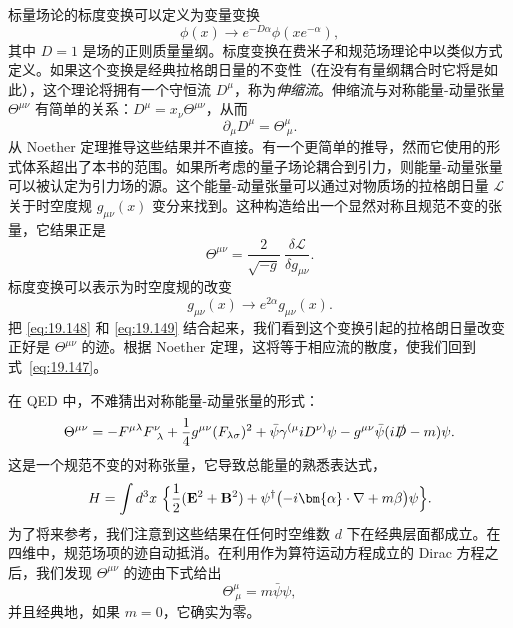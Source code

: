 标量场论的标度变换可以定义为变量变换
\begin{equation}
  \phi(x) \to e^{-D\alpha}\phi(x e^{-\alpha}) ,
  \label{eq:19.146}
\end{equation}
其中 $D = 1$ 是场的正则质量量纲。标度变换在费米子和规范场理论中以类似方式定义。如果这个变换是经典拉格朗日量的不变性（在没有有量纲耦合时它将是如此），这个理论将拥有一个守恒流 $D^\mu$，称为\emph{伸缩流}。伸缩流与对称能量-动量张量 $\Theta^{\mu\nu}$ 有简单的关系：$D^\mu = x_\nu\Theta^{\mu\nu}$，从而
\begin{equation}
  \partial_\mu D^\mu = \Theta^\mu_{\ \mu} .
  \label{eq:19.147}
\end{equation}
从 Noether 定理推导这些结果并不直接。有一个更简单的推导，然而它使用的形式体系超出了本书的范围。如果所考虑的量子场论耦合到引力，则能量-动量张量可以被认定为引力场的源。这个能量-动量张量可以通过对物质场的拉格朗日量 $\mathcal{L}$ 关于时空度规 $g_{\mu\nu}(x)$ 变分来找到。这种构造给出一个显然对称且规范不变的张量，它结果正是
\begin{equation}
  \Theta^{\mu\nu} = \frac{2}{\sqrt{-g}}\ \frac{\delta\mathcal{L}}
    {\delta g_{\mu\nu}} .
  \label{eq:19.148}
\end{equation}
标度变换可以表示为时空度规的改变
\begin{equation}
  g_{\mu\nu}(x) \to e^{2\alpha}g_{\mu\nu}(x) .
  \label{eq:19.149}
\end{equation}
把 \eqref{eq:19.148} 和 \eqref{eq:19.149} 结合起来，我们看到这个变换引起的拉格朗日量改变正好是 $\Theta^{\mu\nu}$ 的迹。根据 Noether 定理，这将等于相应流的散度，使我们回到式~\eqref{eq:19.147}。

在 QED 中，不难猜出对称能量-动量张量的形式：
\begin{equation}
  \Theta^{\mu\nu} = -F^{\mu\lambda}F^{\nu}_{\ \lambda}
    + \frac{1}{4}g^{\mu\nu}(F_{\lambda\sigma})^2
    + \bar{\psi}\gamma^{(\mu}iD^{\nu)}\psi
    - g^{\mu\nu}\bar{\psi}(i\slashed{D} - m)\psi .
  \label{eq:19.150}
\end{equation}
这是一个规范不变的对称张量，它导致总能量的熟悉表达式，
\begin{equation}
  H = \int d^3x\ \Bigl\{ \frac{1}{2}(\mathbf{E}^2 + \mathbf{B}^2)
    + \psi^{\dagger}\bigl( -i\bm{\alpha}\cdot\nabla + m\beta \bigr)\psi
    \Bigr\} .
  \label{eq:19.151}
\end{equation}
为了将来参考，我们注意到这些结果在任何时空维数 $d$ 下在经典层面都成立。在四维中，规范场项的迹自动抵消。在利用作为算符运动方程成立的 Dirac 方程之后，我们发现 $\Theta^{\mu\nu}$ 的迹由下式给出
\begin{equation}
  \Theta^\mu_{\ \mu} = m\bar{\psi}\psi ,
  \label{eq:19.152}
\end{equation}
并且经典地，如果 $m = 0$，它确实为零。

